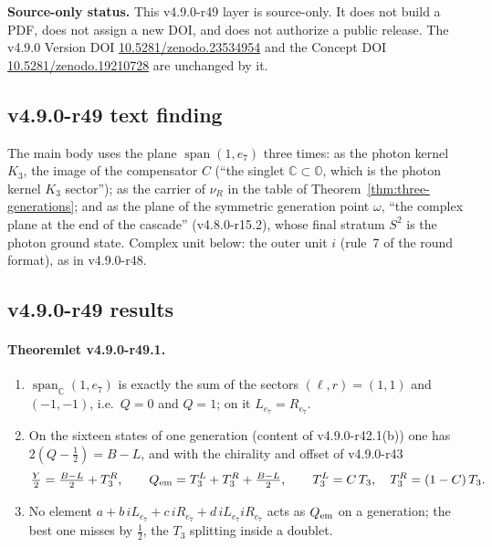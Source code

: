 \noindent\textbf{Source-only status.}
This v4.9.0-r49 layer is source-only.  It does not build a PDF, does not assign a new DOI,
and does not authorize a public release.  The v4.9.0 Version DOI
\href{https://doi.org/10.5281/zenodo.23534954}{10.5281/zenodo.23534954} and the Concept DOI
\href{https://doi.org/10.5281/zenodo.19210728}{10.5281/zenodo.19210728} are unchanged by it.

\subsection*{v4.9.0-r49 text finding}
\label{subsec:v490-r49-text}

The main body uses the plane \(\operatorname{span}(1,e_7)\) three times: as the photon kernel \(K_3\), the image of the compensator \(C\)
(``the singlet \(\mathbb C\subset\mathbb O\), which is the photon kernel \(K_3\) sector''); as the carrier of \(\nu_R\) in the table of
Theorem~\ref{thm:three-generations}; and as the plane of the symmetric generation point \(\omega\), ``the complex plane at the end of the
cascade'' (v4.8.0-r15.2), whose final stratum \(S^2\) is the photon ground state.  Complex unit below: the outer unit \(i\) (rule~7 of the
round format), as in v4.9.0-r48.

\subsection*{v4.9.0-r49 results}
\label{subsec:v490-r49-results}

\paragraph{Theoremlet v4.9.0-r49.1.}
\begin{enumerate}[leftmargin=2em]
\item[(a)] \(\operatorname{span}_{\mathbb C}(1,e_7)\) is exactly the sum of the sectors \((\ell,r)=(1,1)\) and \((-1,-1)\), i.e.\ \(Q=0\) and
\(Q=1\); on it \(L_{e_7}=R_{e_7}\).
\item[(b)] On the sixteen states of one generation (content of v4.9.0-r42.1(b)) one has \(2(Q-\tfrac12)=B-L\), and with the chirality and
offset of v4.9.0-r43
\[
\tfrac{Y}{2}=\tfrac{B-L}{2}+T_3^R,\qquad Q_{\rm em}=T_3^L+T_3^R+\tfrac{B-L}{2},\qquad T_3^L=C\,T_3,\quad T_3^R=(1-C)\,T_3 .
\]
\item[(c)] No element \(a+b\,iL_{e_7}+c\,iR_{e_7}+d\,iL_{e_7}iR_{e_7}\) acts as \(Q_{\rm em}\) on a generation; the best one misses by
\(\tfrac12\), the \(T_3\) splitting inside a doublet.
\end{enumerate}

